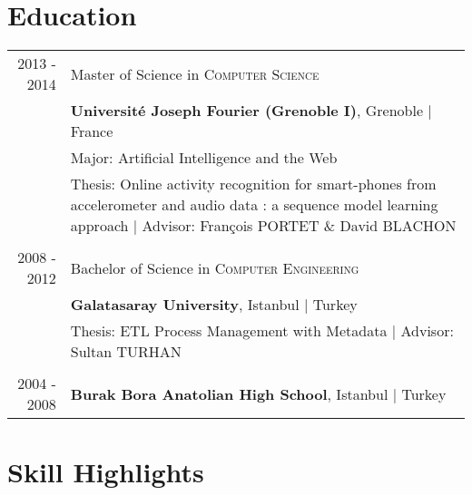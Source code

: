 \documentclass[a4paper,10pt]{article} %
\begin{document}

\section{Education}

\begin{tabular}{r|p{14cm}}

\textsc{2013 - 2014} & Master of Science in \textsc{}\textsc{Computer Science} \\& \normalsize\textbf{Université Joseph Fourier (Grenoble I)}, Grenoble | France\\
&  Major: Artificial Intelligence and the Web\\
& Thesis: Online activity recognition for smart-phones from accelerometer and audio data : a sequence model learning approach | \small Advisor: François \textsc{PORTET} \& David \textsc{BLACHON}  \\
&\\


\textsc{2008 - 2012} & Bachelor of Science in \textsc{}\textsc{Computer Engineering} \\& \normalsize\textbf{Galatasaray University}, Istanbul | Turkey\\
& Thesis: ETL Process Management with Metadata | \small Advisor: Sultan \textsc{TURHAN}\\
&\\


\textsc{2004 - 2008}& \textbf{Burak Bora Anatolian High School}, Istanbul | Turkey
\end{tabular}


\section{Skill Highlights}
\end{document}
